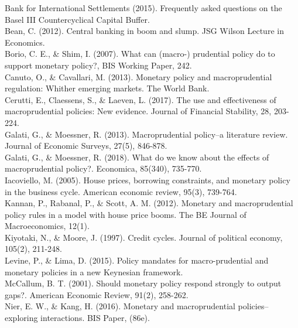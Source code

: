 \documentclass[final,3p,times,twocolumn]{elsarticle}
\begin{document}
Bank for International Settlements (2015). Frequently asked questions on the Basel III Countercyclical Capital Buffer. \\
 
Bean, C. (2012). Central banking in boom and slump. JSG Wilson Lecture in Economics. \\ 

Borio, C. E., \& Shim, I. (2007). What can (macro-) prudential policy do to support monetary policy?, BIS Working Paper, 242. \\

Canuto, O., \& Cavallari, M. (2013). Monetary policy and macroprudential regulation: Whither emerging markets. The World Bank. \\

Cerutti, E., Claessens, S., \& Laeven, L. (2017). The use and effectiveness of macroprudential policies: New evidence. Journal of Financial Stability, 28, 203-224. \\ 

Galati, G., \& Moessner, R. (2013). Macroprudential policy–a literature review. Journal of Economic Surveys, 27(5), 846-878. \\ 

Galati, G., \& Moessner, R. (2018). What do we know about the effects of macroprudential policy?. Economica, 85(340), 735-770. \\ 

Iacoviello, M. (2005). House prices, borrowing constraints, and monetary policy in the business cycle. American economic review, 95(3), 739-764. \\ 

Kannan, P., Rabanal, P., \& Scott, A. M. (2012). Monetary and macroprudential policy rules in a model with house price booms. The BE Journal of Macroeconomics, 12(1). \\

Kiyotaki, N., \& Moore, J. (1997). Credit cycles. Journal of political economy, 105(2), 211-248. \\ 

Levine, P., \& Lima, D. (2015). Policy mandates for macro-prudential and monetary policies in a new Keynesian framework. \\

McCallum, B. T. (2001). Should monetary policy respond strongly to output gaps?. American Economic Review, 91(2), 258-262. \\

Nier, E. W., \& Kang, H. (2016). Monetary and macroprudential policies–exploring interactions. BIS Paper, (86e). \\
\end{document}
